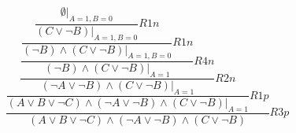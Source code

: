 
$$\dfrac{\dfrac{\dfrac{\dfrac{\dfrac{\dfrac{\emptyset|_{A=1,B=0}}{(C\vee\neg B)|_{A=1,B=0}}R1n}{(\neg B)\wedge(C\vee\neg B)|_{A=1,B=0}}R1n}{(\neg B)\wedge(C\vee\neg B)|_{A=1}}R4n}{(\neg A\vee\neg B)\wedge(C\vee\neg B)|_{A=1}}R2n}{(A\vee B\vee\neg C)\wedge(\neg A\vee\neg B)\wedge(C\vee\neg B)|_{A=1}}R1p}{(A\vee B\vee\neg C)\wedge(\neg A\vee\neg B)\wedge(C\vee\neg B)}R3p$$
